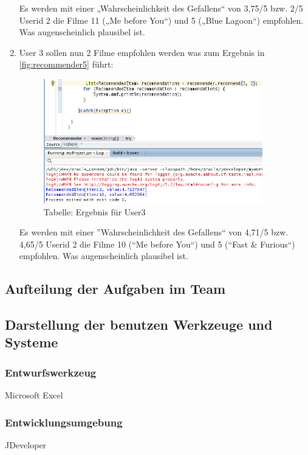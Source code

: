 \begin{enumerate}
Es werden mit einer „Wahrscheinlichkeit des Gefallens“ von 3,75/5 bzw. 2/5 Userid 2 die Filme 11 („Me before You“) und 5 („Blue Lagoon“) empfohlen. Was augenscheinlich plausibel ist.

\item User 3 sollen nun 2 Filme empfohlen werden was zum Ergebnis in \autoref{fig:recommender5} führt:
\begin{figure}[!htb]
        \begin{minipage}{1\textwidth}
                \centering
                \includegraphics[width=0.90\textwidth]{pics/recommender5.png}\par\vspace{0cm}
                \caption{Tabelle: Ergebnis für User3}
                \label{fig:recommender5}
        \end{minipage}
\end{figure}


Es werden mit einer ''Wahrscheinlichkeit des Gefallens`` von 4,71/5 bzw. 4,65/5 Userid 2 die Filme 10 (``Me before You``) und 5 (``Fast \& Furious``) empfohlen. Was augenscheinlich plausibel ist.

\end{enumerate}

\subsection*{Aufteilung der Aufgaben im Team}
\subsection*{Darstellung der benutzen Werkzeuge und Systeme}
\subsubsection*{Entwurfswerkzeug}
Microsoft Excel
\subsubsection*{Entwicklungsumgebung}
JDeveloper


